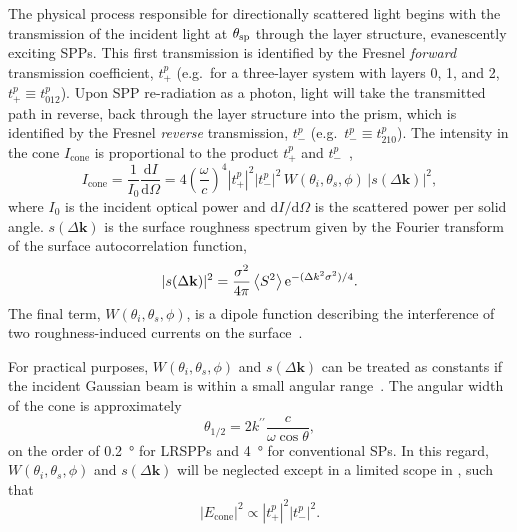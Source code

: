 The physical process responsible for directionally scattered light begins
with the transmission of the incident light at $\theta_\mathrm{sp}$ through the layer
structure, evanescently exciting SPPs.  This first transmission is
identified by the Fresnel \textit{forward} transmission coefficient,
$t^p_+$ (e.g.\ for a three-layer system with layers 0, 1, and 2, $t^p_+
\equiv t^p_{012}$).  Upon SPP re-radiation as a photon, light will take the
transmitted path in reverse, back through the layer structure into the
prism, which is identified by the Fresnel \textit{reverse} transmission,
$t^p_-$ (e.g.\  $t^p_- \equiv t^p_{210}$).  The intensity in the cone
$I_\mathrm{cone}$ is proportional to the product $t^p_+$ and $t^p_-$~\cite{simon1976directional},
\begin{equation}
I_\mathrm{cone}
= \frac{1}{I_0}\frac{\mathrm{d}I}{\mathrm{d}\Omega}
= 4 {\left(\frac{\omega}{c}\right)}^4 |t^p_+|^2
|t^p_-|^2\,W(\theta_i,\theta_s,\phi)\, |s(\Delta \mathbf{k})|^2
\label{eqn:guhacone},
\end{equation}
where $I_0$ is the incident optical power and
$\mathrm{d}I/\mathrm{d}\Omega$ is the scattered power per solid angle.
$s(\Delta \mathbf{k})$ is the surface roughness spectrum given by the Fourier
transform of the surface autocorrelation function,
\begin{equation}
|s(\Delta \mathbf{k})|^2 = \frac{\sigma^2}{4\pi} \left<S^2\right>
{\mathrm{e}}^{-(\Delta k^2 \sigma^2)/4}.
\label{eqn:surfaceroughness}
\end{equation}
The final term, $W(\theta_i,\theta_s,\phi)$, is a dipole function describing
the interference of two roughness-induced currents on the
surface~\cite{raether1997surface}.

For practical purposes, $W(\theta_i,\theta_s,\phi)$ and $s(\Delta
\mathbf{k})$ can be treated as constants if the incident Gaussian beam is
within a small angular range~\cite{heitmann1977determination}.  The angular
width of the cone is approximately
\begin{equation}
\theta_{1/2} = 2 k^{\prime\prime} \frac{c}{\omega \cos \theta},
\end{equation}
on the order of \SI{0.2}{\degree} for LRSPPs and \SI{4}{\degree} for
conventional SPs.  In this regard, $W(\theta_i,\theta_s,\phi)$ and
$s(\Delta \mathbf{k})$ will be neglected
except in a limited scope in , such that
\begin{equation}
|E_\mathrm{cone}|^2 \propto	|t^p_+|^2 |t^p_-|^2.
\label{eqn:conefield}
\end{equation}

